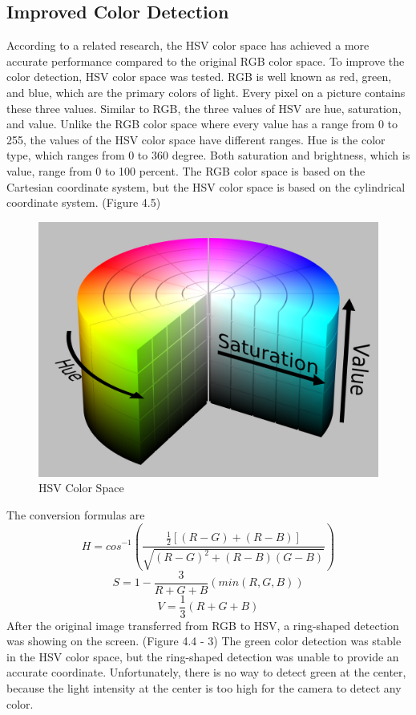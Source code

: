 \documentclass[letterpaper,12pt,oneside]{book}
\begin{document}
		\subsection{Improved Color Detection}
		
		According to a related research, the HSV color space has achieved a more accurate performance compared to the original RGB color space. \cite{kaur2013content} To improve the color detection, HSV color space was tested. RGB is well known as red, green, and blue, which are the primary colors of light. Every pixel on a picture contains these three values. Similar to RGB, the three values of HSV are hue, saturation, and value. Unlike the RGB color space where every value has a range from 0 to 255, the values of the HSV color space have different ranges. Hue is the color type, which ranges from 0 to 360 degree. Both saturation and brightness, which is value, range from 0 to 100 percent. The RGB color space is based on the Cartesian coordinate system, but the HSV color space is based on the cylindrical coordinate system. (Figure 4.5)
		\begin{figure}[ht!]
			\begin{center}
				\includegraphics[scale = 0.2]{HSV.png}
				\caption{HSV Color Space}
			\end{center}
		\end{figure}
		
		The conversion formulas are
		\begin{equation}
		H = cos^{-1}(\frac{\frac{1}{2}[(R-G)+(R-B)]}{\sqrt{(R-G)^{2}+(R-B)(G-B)}})
		\end{equation}
		\begin{equation}
		S = 1-\frac{3}{R+G+B}(min(R,G,B))
		\end{equation}
		\begin{equation}
		V = \frac{1}{3}(R+G+B)
		\end{equation}
		After the original image transferred from RGB to HSV, a ring-shaped detection was showing on the screen. (Figure 4.4 - 3) The green color detection was stable in the HSV color space, but the ring-shaped detection was unable to provide an accurate coordinate. Unfortunately, there is no way to detect green at the center, because the light intensity at the center is too high for the camera to detect any color.
\end{document}
